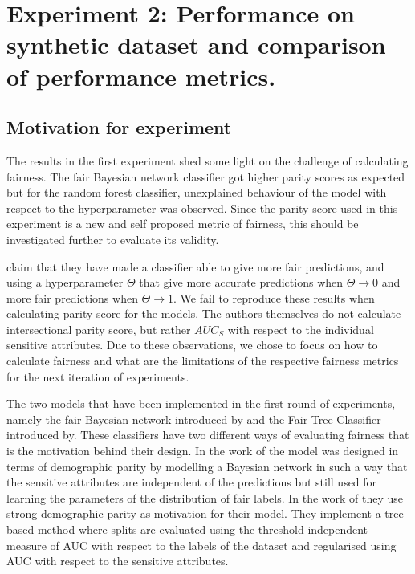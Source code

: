 \section{Experiment 2: Performance on synthetic dataset and comparison of performance metrics.}

\subsection{Motivation for experiment}

The results in the first experiment shed some light on the challenge of calculating fairness. The fair Bayesian network classifier got higher parity scores as expected but for the random forest classifier, unexplained behaviour of the model with respect to the hyperparameter was observed. Since the parity score used in this experiment is a new and self proposed metric of fairness, this should be investigated further to evaluate its validity.

\citet{Antonio:2021:arXiv} claim that they have made a classifier able to give more fair predictions, and using a hyperparameter $\Theta$ that give more accurate predictions when $\Theta \rightarrow 0$ and more fair predictions when $\Theta \rightarrow 1$. We fail to reproduce these results when calculating parity score for the models. The authors themselves do not calculate intersectional parity score, but rather $AUC_S$ with respect to the individual sensitive attributes. Due to these observations, we chose to focus on how to calculate fairness and what are the limitations of the respective fairness metrics for the next iteration of experiments.

The two models that have been implemented in the first round of experiments, namely the fair Bayesian network introduced by and the Fair Tree Classifier introduced by. These classifiers have two different ways of evaluating fairness that is the motivation behind their design. In the work of \citet{Choi:2021:AIII} the model was designed in terms of demographic parity by modelling a Bayesian network in such a way that the sensitive attributes are independent of the predictions but still used for learning the parameters of the distribution of fair labels. In the work of \citet{Antonio:2021:arXiv} they use strong demographic parity as motivation for their model. They implement a tree based method where splits are evaluated using the threshold-independent measure of AUC with respect to the labels of the dataset and  regularised using AUC with respect to the sensitive attributes. 

